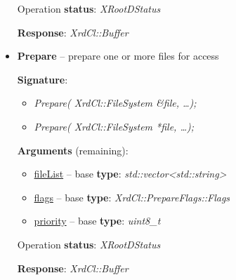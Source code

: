 \documentclass{article}
\begin{document}
\begin{itemize}
\begin{samepage}
                    Operation \textbf{status}: \textit{XRootDStatus}

                    \textbf{Response}: \textit{XrdCl::Buffer}
                    
                \end{samepage}
                    
                \item \begin{samepage} \textbf{Prepare} -- prepare one or more files for access

                    \textbf{Signature}:
                    \begin{itemize}
                        \item \textit{Prepare( XrdCl::FileSystem \&file, \ldots);}
                        \item \textit{Prepare( XrdCl::FileSystem *file, \ldots );}
                    \end{itemize}

                    \textbf{Arguments} (remaining):
                    \begin{itemize}
                        \item \underline{fileList} -- base \textbf{type}: \textit{std::vector<std::string>}
                        \item \underline{flags} -- base \textbf{type}: \textit{XrdCl::PrepareFlags::Flags}
                        \item \underline{priority} -- base \textbf{type}: \textit{uint8_t}
                    \end{itemize}

                    Operation \textbf{status}: \textit{XRootDStatus}

                    \textbf{Response}: \textit{XrdCl::Buffer}
                    
                \end{samepage}
                    
                    
            \end{itemize}
	    
\end{document}
